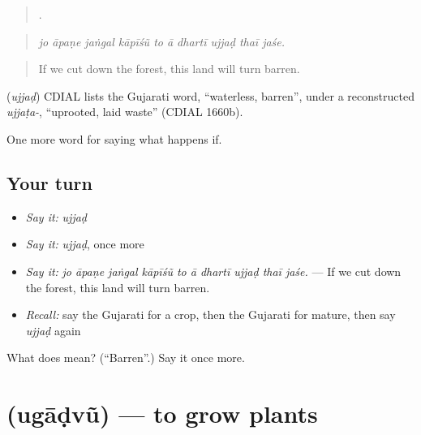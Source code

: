 \begin{quote}
         .
\end{quote}

\begin{quote}
\emph{jo āpaṇe jaṅgal kāpīśũ to ā dhartī ujjaḍ thaī jaśe.}
\end{quote}

\begin{quote}
If we cut down the forest, this land will turn barren.
\end{quote}

\begin{cousinweb}
\textbf{} (\emph{ujjaḍ}) CDIAL lists the Gujarati word, \textquotedblleft{}waterless, barren\textquotedblright{}, under a reconstructed \emph{ujjaṭa-}, \textquotedblleft{}uprooted, laid waste\textquotedblright{} (CDIAL 1660b).
\end{cousinweb}

\begin{grammarlens}[title={What you've built}]
One more word for saying what happens if.
\end{grammarlens}

\subsection*{Your turn}
\begin{itemize}
\raggedright
  \item \emph{Say it:} \emph{ujjaḍ}
  \item \emph{Say it:} \emph{ujjaḍ}, once more
  \item \emph{Say it:} \emph{jo āpaṇe jaṅgal kāpīśũ to ā dhartī ujjaḍ thaī jaśe.} — If we cut down the forest, this land will turn barren.
  \item \emph{Recall:} say the Gujarati for a crop, then the Gujarati for mature, then say \emph{ujjaḍ} again
\end{itemize}

\begin{tcolorbox}[breakable,colback=teal!4,colframe=teal!35!black,title={Before you move on}]
What does  mean? (\textquotedblleft{}Barren\textquotedblright{}.) Say it once more.
\end{tcolorbox}
\section[\texorpdfstring{\gu{ઉગાડવું} (ugāḍvũ)}{ઉગાડવું (ugāḍvũ)}]{ (ugāḍvũ) — to grow plants}

